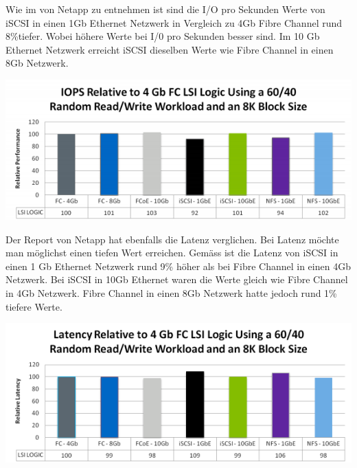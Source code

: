 Wie im  von Netapp zu entnehmen ist sind die I/O pro Sekunden Werte von iSCSI in einen 1Gb Ethernet Netzwerk in Vergleich zu 4Gb Fibre Channel rund 8\%tiefer. Wobei höhere Werte bei I/0 pro Sekunden besser sind. Im 10 Gb Ethernet Netzwerk erreicht iSCSI dieselben Werte wie Fibre Channel in einen 8Gb Netzwerk.\cite{Jafri2011}

\begin{center}
\includegraphics[width=\linewidth, keepaspectratio = true]{media/netapp_iops.png}
\end{center}

Der Report von Netapp hat ebenfalls die Latenz verglichen. Bei Latenz möchte man möglichst einen tiefen Wert erreichen. Gemäss  ist die Latenz von iSCSI in einen 1 Gb Ethernet Netzwerk rund 9\% höher als bei Fibre Channel in einen 4Gb Netzwerk. Bei iSCSI in 10Gb Ethernet waren die Werte gleich wie Fibre Channel in 4Gb Netzwerk. Fibre Channel in einen 8Gb Netzwerk hatte jedoch rund 1\% tiefere Werte.\cite{Jafri2011}

\begin{center}
\includegraphics[width=\linewidth, keepaspectratio = true]{media/netapp_latence.png}
\end{center}
 


